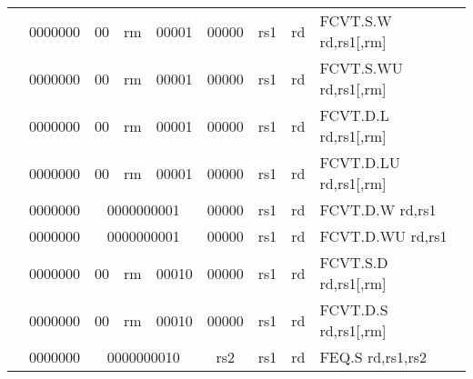 \begin{table}[p]
\begin{small}
\begin{center}
\begin{tabular}{rcccccccccl}
&
\multicolumn{1}{|c|}{0000000} &
\multicolumn{1}{c|}{00} &
\multicolumn{2}{c|}{rm} &
\multicolumn{2}{c|}{00001} &
\multicolumn{1}{c|}{00000} &
\multicolumn{1}{c|}{rs1} &
\multicolumn{1}{c|}{rd} & FCVT.S.W rd,rs1[,rm] \\
\cline{2-10}
  

&
\multicolumn{1}{|c|}{0000000} &
\multicolumn{1}{c|}{00} &
\multicolumn{2}{c|}{rm} &
\multicolumn{2}{c|}{00001} &
\multicolumn{1}{c|}{00000} &
\multicolumn{1}{c|}{rs1} &
\multicolumn{1}{c|}{rd} & FCVT.S.WU rd,rs1[,rm] \\
\cline{2-10}
  

&
\multicolumn{1}{|c|}{0000000} &
\multicolumn{1}{c|}{00} &
\multicolumn{2}{c|}{rm} &
\multicolumn{2}{c|}{00001} &
\multicolumn{1}{c|}{00000} &
\multicolumn{1}{c|}{rs1} &
\multicolumn{1}{c|}{rd} & FCVT.D.L rd,rs1[,rm] \\
\cline{2-10}
  

&
\multicolumn{1}{|c|}{0000000} &
\multicolumn{1}{c|}{00} &
\multicolumn{2}{c|}{rm} &
\multicolumn{2}{c|}{00001} &
\multicolumn{1}{c|}{00000} &
\multicolumn{1}{c|}{rs1} &
\multicolumn{1}{c|}{rd} & FCVT.D.LU rd,rs1[,rm] \\
\cline{2-10}
  

&
\multicolumn{1}{|c|}{0000000} &
\multicolumn{5}{c|}{0000000001} &
\multicolumn{1}{c|}{00000} &
\multicolumn{1}{c|}{rs1} &
\multicolumn{1}{c|}{rd} & FCVT.D.W rd,rs1 \\
\cline{2-10}
  

&
\multicolumn{1}{|c|}{0000000} &
\multicolumn{5}{c|}{0000000001} &
\multicolumn{1}{c|}{00000} &
\multicolumn{1}{c|}{rs1} &
\multicolumn{1}{c|}{rd} & FCVT.D.WU rd,rs1 \\
\cline{2-10}
  

&
\multicolumn{1}{|c|}{0000000} &
\multicolumn{1}{c|}{00} &
\multicolumn{2}{c|}{rm} &
\multicolumn{2}{c|}{00010} &
\multicolumn{1}{c|}{00000} &
\multicolumn{1}{c|}{rs1} &
\multicolumn{1}{c|}{rd} & FCVT.S.D rd,rs1[,rm] \\
\cline{2-10}
  

&
\multicolumn{1}{|c|}{0000000} &
\multicolumn{1}{c|}{00} &
\multicolumn{2}{c|}{rm} &
\multicolumn{2}{c|}{00010} &
\multicolumn{1}{c|}{00000} &
\multicolumn{1}{c|}{rs1} &
\multicolumn{1}{c|}{rd} & FCVT.D.S rd,rs1[,rm] \\
\cline{2-10}
  

&
\multicolumn{1}{|c|}{0000000} &
\multicolumn{5}{c|}{0000000010} &
\multicolumn{1}{c|}{rs2} &
\multicolumn{1}{c|}{rs1} &
\multicolumn{1}{c|}{rd} & FEQ.S rd,rs1,rs2 \\
\cline{2-10}
  


\end{tabular}
\end{center}
\end{small}
\end{table}
